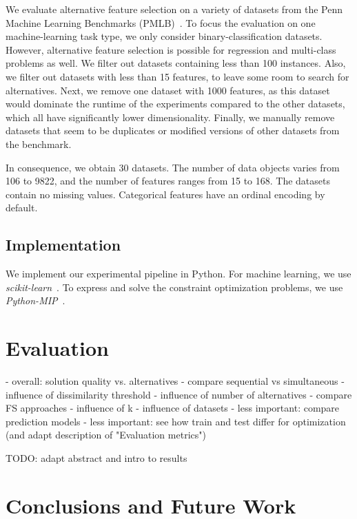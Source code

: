 \documentclass{article}
\theoremstyle{definition}
\begin{document}
We evaluate alternative feature selection on a variety of datasets from the Penn Machine Learning Benchmarks (PMLB)~\cite{olson2017pmlb,romano2021pmlb}.
To focus the evaluation on one machine-learning task type, we only consider binary-classification datasets.
However, alternative feature selection is possible for regression and multi-class problems as well.
We filter out datasets containing less than 100 instances.
Also, we filter out datasets with less than 15 features, to leave some room to search for alternatives.
Next, we remove one dataset with 1000 features, as this dataset would dominate the runtime of the experiments compared to the other datasets, which all have significantly lower dimensionality.
Finally, we manually remove datasets that seem to be duplicates or modified versions of other datasets from the benchmark.

In consequence, we obtain 30 datasets.
The number of data objects varies from 106 to 9822, and the number of features ranges from 15 to 168.
The datasets contain no missing values.
Categorical features have an ordinal encoding by default.

\subsection{Implementation}
\label{sec:experimental-design:implementation}

We implement our experimental pipeline in Python.
For machine learning, we use \emph{scikit-learn}~\cite{pedregosa2011scikit-learn}.
To express and solve the constraint optimization problems, we use \emph{Python-MIP}~\cite{python-mip}.

\section{Evaluation}
\label{sec:evaluation}

- overall: solution quality vs. alternatives
- compare sequential vs simultaneous
- influence of dissimilarity threshold
- influence of number of alternatives
- compare FS approaches
- influence of k
- influence of datasets
- less important: compare prediction models
- less important: see how train and test differ for optimization (and adapt description of "Evaluation metrics")

TODO: adapt abstract and intro to results

\section{Conclusions and Future Work}
\label{sec:conclusion}
\end{document}
